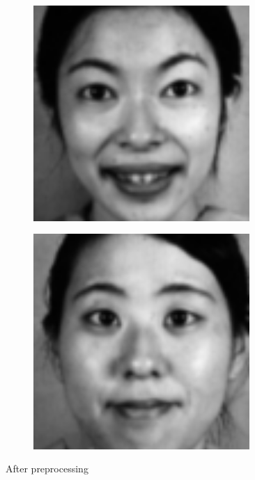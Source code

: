\documentclass[a4paper, 12pt]{article}
\begin{document}
\begin{figure}[H]
	\centering
	\begin{subfigure}[b]{0.4\textwidth}
		\includegraphics[width=0.9\textwidth]{./processed/img1.png}
	\end{subfigure}
	\begin{subfigure}[b]{0.4\textwidth}
		\includegraphics[width=0.9\textwidth]{./processed/img2.png}
	\end{subfigure}
	\caption[]{After preprocessing}
	\label{fig:afterpre}
\end{figure}
\end{document}
